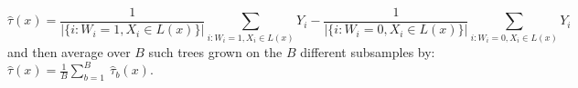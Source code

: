 \begin{equation}\label{eq:tau_crf}
    \hat{\tau}(x) = 
    \frac{1}{|\{i:W_i = 1, X_i \in L(x)\}|}\sum_{i:W_i = 1, X_i \in L(x)}Y_i -
    \frac{1}{|\{i:W_i = 0, X_i \in L(x)\}|}\sum_{i:W_i = 0, X_i \in L(x)}Y_i
\end{equation}
and then average over \(B\) such trees grown on the \(B\) different subsamples by: \(\hat{\tau}(x) = \frac{1}{B}\sum_{b=1}^B\ \hat{\tau}_b(x)\).
